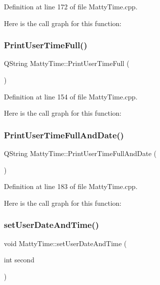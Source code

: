 Definition at line 172 of file Matty\+Time.\+cpp.

Here is the call graph for this function\+:
\hypertarget{classMattyTime_a3fda0198071ebc95afe2d4405dd9c55e}{}\label{classMattyTime_a3fda0198071ebc95afe2d4405dd9c55e} 
\subsubsection{\texorpdfstring{Print\+User\+Time\+Full()}{PrintUserTimeFull()}}
{\footnotesize\ttfamily Q\+String Matty\+Time\+::\+Print\+User\+Time\+Full (\begin{DoxyParamCaption}{ }\end{DoxyParamCaption})}



Definition at line 154 of file Matty\+Time.\+cpp.

Here is the call graph for this function\+:
\hypertarget{classMattyTime_a6bcaa1f4975d99ab2f9025076de5ef99}{}\label{classMattyTime_a6bcaa1f4975d99ab2f9025076de5ef99} 
\subsubsection{\texorpdfstring{Print\+User\+Time\+Full\+And\+Date()}{PrintUserTimeFullAndDate()}}
{\footnotesize\ttfamily Q\+String Matty\+Time\+::\+Print\+User\+Time\+Full\+And\+Date (\begin{DoxyParamCaption}{ }\end{DoxyParamCaption})}



Definition at line 183 of file Matty\+Time.\+cpp.

Here is the call graph for this function\+:
\hypertarget{classMattyTime_a858357a5febc483c27f9bbf96b83b175}{}\label{classMattyTime_a858357a5febc483c27f9bbf96b83b175} 
\subsubsection{\texorpdfstring{set\+User\+Date\+And\+Time()}{setUserDateAndTime()}\hspace{0.1cm}{\footnotesize\ttfamily [1/5]}}
{\footnotesize\ttfamily void Matty\+Time\+::set\+User\+Date\+And\+Time (\begin{DoxyParamCaption}\item[{int}]{second }\end{DoxyParamCaption})}



